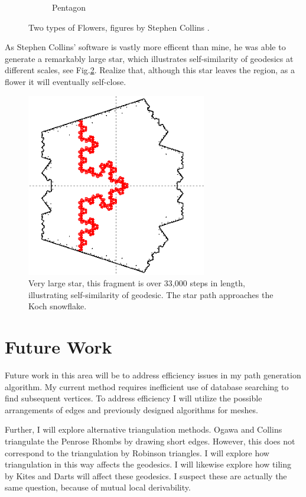 \documentclass[
  oneside,
  11pt, a4paper,
  footinclude=true,
  headinclude=true,
  cleardoublepage=empty
]{scrbook}
\begin{document}
\begin{figure}[H]
\begin{subfigure}[b]{0.45\textwidth}
\caption[Pentagon]{Pentagon}
\end{subfigure}
\caption[Rings]{Two types of Flowers, figures by Stephen Collins \cite{Collins}.}
\label{fig:collinsflowers}
\end{figure}
As Stephen Collins' software is vastly more efficent than mine, he was able to generate a remarkably large star, which illustrates self-similarity of geodesics at different scales, see Fig.\ref{fig:Koch}. Realize that, although this star leaves the region, as a flower it will eventually self-close. 
\begin{figure}[H]
\centering
\includegraphics[width=0.7\textwidth]{Koch}
\caption[Koch Curve Limit]{Very large star, this fragment is over 33,000 steps in length, illustrating self-similarity of geodesic. The star path approaches the Koch snowflake. \cite{Collins}}
\label{fig:Koch}
\end{figure}

\section{Future Work}
Future work in this area will be to address efficiency issues in my path generation algorithm. My current method requires inefficient use of database searching to find subsequent vertices. To address efficiency I will utilize the possible arrangements of edges and previously designed algorithms for meshes. 

Further, I will explore alternative triangulation methods. Ogawa and Collins triangulate the Penrose Rhombs by drawing short edges. However, this does not correspond to the triangulation by Robinson triangles. I will explore how triangulation in this way affects the geodesics. I will likewise explore how tiling by Kites and Darts will affect these geodesics. I suspect these are actually the same question, because of mutual local derivability.
\end{document}
